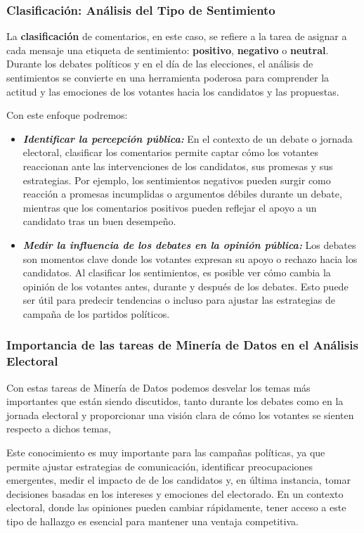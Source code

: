 \documentclass[10pt, a4paper]{article}
\begin{document}
	\subsubsection{Clasificación: Análisis del Tipo de Sentimiento}
	La \textbf{clasificación} de comentarios, en este caso, se refiere a la tarea de asignar a cada mensaje una etiqueta de sentimiento: \textbf{positivo}, \textbf{negativo} o \textbf{neutral}. Durante los debates políticos y en el día de las elecciones, el análisis de sentimientos se convierte en una herramienta poderosa para comprender la actitud y las emociones de los votantes hacia los candidatos y las propuestas.
	
	Con este enfoque podremos:
	\begin{itemize}
		\item \textbf{\textit{Identificar la percepción pública:}} En el contexto de un debate o jornada electoral, clasificar los comentarios permite captar cómo los votantes reaccionan ante las intervenciones de los candidatos, sus promesas y sus estrategias. Por ejemplo, los sentimientos negativos pueden surgir como reacción a promesas incumplidas o argumentos débiles durante un debate, mientras que los comentarios positivos pueden reflejar el apoyo a un candidato tras un buen desempeño.
		\item \textbf{\textit{Medir la influencia de los debates en la opinión pública:}} Los debates son momentos clave donde los votantes expresan su apoyo o rechazo hacia los candidatos. Al clasificar los sentimientos, es posible ver cómo cambia la opinión de los votantes antes, durante y después de los debates. Esto puede ser útil para predecir tendencias o incluso para ajustar las estrategias de campaña de los partidos políticos.
	\end{itemize}
	
	
	\subsubsection{Importancia de las tareas de Minería de Datos en el Análisis Electoral}
	Con estas tareas de Minería de Datos podemos desvelar los temas más importantes que están siendo discutidos, tanto durante los debates como en la jornada electoral y proporcionar una visión clara de cómo los votantes se sienten respecto a dichos temas,  
	
	Este conocimiento es muy importante para las campañas políticas, ya que permite ajustar estrategias de comunicación, identificar preocupaciones emergentes, medir el impacto de de los candidatos y, en última instancia, tomar decisiones basadas en los intereses y emociones del electorado. En un contexto electoral, donde las opiniones pueden cambiar rápidamente, tener acceso a este tipo de hallazgo es esencial para mantener una ventaja competitiva.
	
\end{document}
